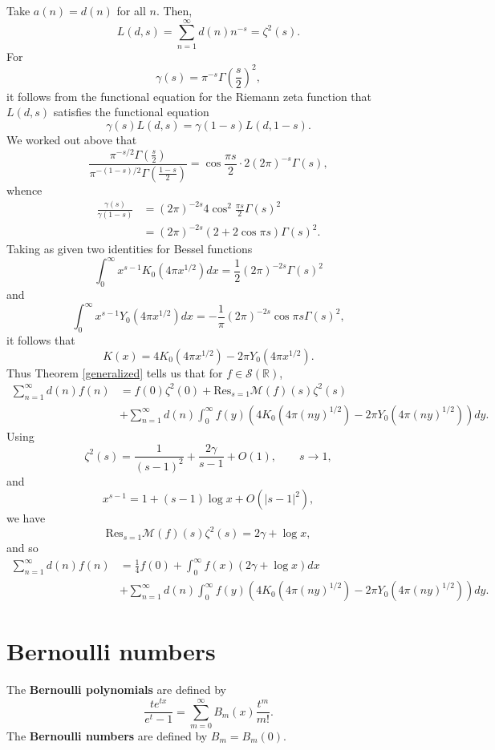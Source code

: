 \documentclass{article}
\newcommand{\Res}{\mathrm{Res}}
\theoremstyle{definition}
\begin{document}
Take $a(n)=d(n)$ for all $n$. Then,
\[
L(d,s) = \sum_{n=1}^\infty d(n) n^{-s} =  \zeta^2(s).
\]
For
\[
\gamma(s) = \pi^{-s} \Gamma\left( \frac{s}{2} \right)^2,
\]
it follows from the functional equation for the Riemann zeta function that
$L(d,s)$ satisfies the functional equation
\[
\gamma(s) L(d,s) = \gamma(1-s)L(d,1-s).
\]
We worked out above that
\[
\frac{\pi^{-s/2} \Gamma\left( \frac{s}{2} \right)}{\pi^{-(1-s)/2} \Gamma\left( \frac{1-s}{2} \right)} = \cos \frac{\pi s}{2} \cdot 2 (2\pi)^{-s} \Gamma(s),
\]
whence
\begin{align*}
\frac{\gamma(s)}{\gamma(1-s)} &=  (2\pi)^{-2s} 4\cos^2 \frac{\pi s}{2}  \Gamma(s)^2\\
&=(2\pi)^{-2s}(2+2\cos \pi s) \Gamma(s)^2.
\end{align*}
Taking as given two identities for Bessel functions
\[
\int_0^\infty x^{s-1} K_0(4\pi x^{1/2}) dx = \frac{1}{2}(2\pi)^{-2s} \Gamma(s)^2
\]
and
\[
\int_0^\infty x^{s-1} Y_0(4\pi x^{1/2}) dx = -\frac{1}{\pi} (2\pi)^{-2s} \cos \pi s \Gamma(s)^2,
\]
it follows that
\[
K(x) = 4K_0(4\pi x^{1/2}) - 2\pi Y_0(4\pi x^{1/2}).
\]
Thus Theorem \ref{generalized} tells us that for $f \in \mathscr{S}(\mathbb{R})$,
\begin{align*}
\sum_{n=1}^\infty d(n) f(n)&=f(0) \zeta^2(0) +
\Res_{s=1}  \mathscr{M}(f)(s)\zeta^2(s)\\
&+ \sum_{n=1}^\infty d(n) \int_0^\infty f(y) 
\left( 4K_0(4\pi (ny)^{1/2}) - 2\pi Y_0(4\pi (ny)^{1/2}) \right) dy.
\end{align*}
Using
\[
\zeta^2(s) = \frac{1}{(s-1)^2}+\frac{2\gamma}{s-1}+O(1), \qquad s \to 1,
\]
and
\[
x^{s-1} = 1+ (s-1) \log x + O(|s-1|^2),
\]
we have 
\[
\Res_{s=1} \mathscr{M}(f)(s)\zeta^2(s)=2\gamma+\log x,
\]
and so
\begin{align*}
\sum_{n=1}^\infty d(n) f(n)&=\frac{1}{4} f(0) +
\int_0^\infty f(x)(2\gamma+\log x) dx
\\
&+ \sum_{n=1}^\infty d(n) \int_0^\infty f(y) 
\left( 4K_0(4\pi (ny)^{1/2}) - 2\pi Y_0(4\pi (ny)^{1/2}) \right) dy.
\end{align*}



\section{Bernoulli numbers}
The \textbf{Bernoulli polynomials} are defined by
\[
\frac{te^{tx}}{e^t-1} = \sum_{m=0}^\infty B_m(x) \frac{t^m}{m!}.
\]
The \textbf{Bernoulli numbers} are defined by $B_m=B_m(0)$. 
\end{document}
